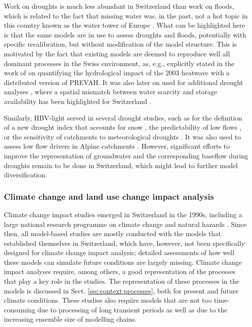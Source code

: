 \documentclass[10pt,a4paper]{article}
\begin{document}
Work on droughts is much less abundant in Switzerland than work on floods, which is related to the fact that missing water was, in the past, not a hot topic in this country known as the water tower of Europe \citep{Milano2015}. What can be highlighted here is that the same models are in use to assess droughts and floods, potentially with specific recalibration, but without modification of the model structure. This is motivated by the fact that existing models are deemed to reproduce well all dominant processes in the Swiss environment, as, e.g., explicitly stated in the work of \citet{Zappa2007a} on quantifying the hydrological impact of the 2003 heatwave with a distributed version of PREVAH. It was also later on used for additional drought analyses \citep{Brunner2019e, Zappa2019}, where a spatial mismatch between water scarcity and storage availability has been highlighted for Switzerland \citep{Brunner2019e}. 

Similarly, HBV-light served in several drought studies, such as for the definition of a new drought index that accounts for snow \citep{Staudinger2014}, the predictability of low flows \citep{Staudinger2014a}, or the sensitivity of catchments to meteorological droughts \citep{Staudinger2015}. It was also used to assess low flow drivers in Alpine catchments \citep{Arnoux2020}. However, significant efforts to improve the representation of groundwater and the corresponding baseflow during droughts remain to be done in Switzerland, which might lead to further model diversification.


\subsubsection{Climate change and land use change impact analysis}
\label{sec:context:climatechange}

Climate change impact studies emerged in Switzerland in the 1990s, including a large national research programme on climate change and natural hazards \citep{SNFS2021}. Since then, all model-based studies are mostly conducted with the models that established themselves in Switzerland, which have, however, not been specifically designed for climate change impact analysis; detailed assessments of how well these models can simulate future conditions are largely missing. Climate change impact analyses require, among others, a good representation of the processes that play a key role in the studies. The representation of these processes in the models is discussed in Sect. \ref{sec:context:processes}, both for present and future climate conditions. These studies also require models that are not too time-consuming due to processing of long transient periods as well as due to the increasing ensemble size of modelling chains.
\end{document}
